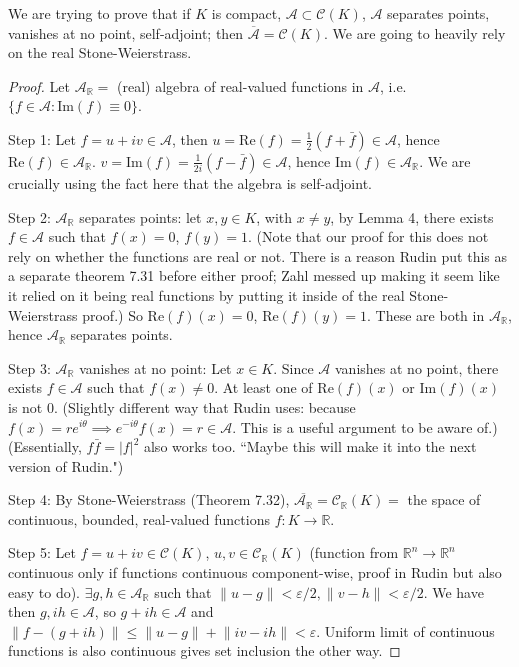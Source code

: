 \documentclass{article}
\theoremstyle{plain}
\theoremstyle{remark}
\newcommand{\R}{{\mathbb R}}
\newcommand{\ep}{{\varepsilon}}
\begin{document}
We are trying to prove that if $K$ is compact, $\mathcal{A} \subset \mathcal{C}(K)$,
$\mathcal{A}$ separates points, vanishes at no point, self-adjoint;
then $\overline{\mathcal{A}} = \mathcal{C}(K)$.
We are going to heavily rely on the real Stone-Weierstrass.
\begin{proof}
	Let $\mathcal{A}_\R = $ (real) algebra of real-valued functions in $\mathcal{A}$,
	i.e. $\{f \in \mathcal{A} \colon \mathrm{Im}(f) \equiv 0\}$.
	
	Step 1: Let $f = u + iv \in \mathcal{A}$, then
	$u = \mathrm{Re}(f) = \frac12(f + \bar{f}) \in \mathcal{A}$,
	hence $\mathrm{Re}(f) \in \mathcal{A}_\R$.
	$v = \mathrm{Im}(f) = \frac{1}{2i}(f - \bar{f}) \in \mathcal{A}$,
	hence $\mathrm{Im}(f) \in \mathcal{A}_\R$.
	We are crucially using the fact here that the algebra is self-adjoint.
	
	Step 2: $\mathcal{A}_\R$ separates points: let $x,y \in K$, with $x \neq y$,
	by Lemma 4, there exists $f \in \mathcal{A}$ such that $f(x) = 0$, $f(y) = 1$.
	(Note that our proof for this does not rely on whether the functions are real or not.
	There is a reason Rudin put this as a separate theorem 7.31 before either proof;
	Zahl messed up making it seem like it relied on it being real functions
	by putting it inside of the real Stone-Weierstrass proof.)
	So $\mathrm{Re}(f)(x) = 0$, $\mathrm{Re}(f)(y) = 1$.
	These are both in $\mathcal{A}_\R$, hence $\mathcal{A}_\R$ separates points.

	Step 3: $\mathcal{A}_\R$ vanishes at no point:
	Let $x \in K$. Since $\mathcal{A}$ vanishes at no point,
	there exists $f \in \mathcal{A}$ such that $f(x) \neq 0$.
	At least one of $\mathrm{Re}(f)(x)$ or $\mathrm{Im}(f)(x)$ is not $0$.
	(Slightly different way that Rudin uses:
	because $f(x) = re^{i\theta} \implies e^{-i\theta}f(x) = r \in \mathcal{A}$.
	This is a useful argument to be aware of.)
	(Essentially, $f\bar{f} = \lvert f \rvert^2$ also works too.
	``Maybe this will make it into the next version of Rudin.")

	Step 4: By Stone-Weierstrass (Theorem 7.32),
	$\overline{\mathcal{A}_\R} = \mathcal{C}_\R(K) = $ the space of continuous,
	bounded, real-valued functions $f \colon K \to \R$.

	Step 5: Let $f = u + iv \in \mathcal{C}(K)$,
	$u,v \in \mathcal{C}_\R(K)$
	(function from $\R^n \to \R^n$ continuous only if functions continuous component-wise,
	proof in Rudin but also easy to do).
	$\exists g,h \in \mathcal{A}_\R$ such that
	$\lVert u - g \rVert < \ep/2, \lVert v - h \rVert < \ep/2$.
	We have then $g,ih \in \mathcal{A}$, so $g + ih \in \mathcal{A}$ and
	$\lVert f - (g+ih)\rVert \leq \lVert u - g \rVert + \lVert iv - ih \rVert < \ep$.
	Uniform limit of continuous functions is also continuous
	gives set inclusion the other way.
\end{proof}
\end{document}
